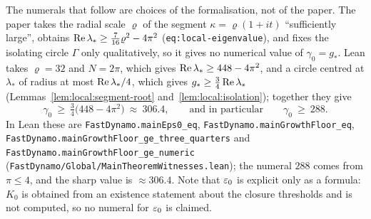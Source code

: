 The numerals that follow are choices of the formalisation, not of the paper.  The paper
takes the radial scale $\varrho$ of the segment $\kappa=\varrho(1+it)$ ``sufficiently
large'', obtains $\operatorname{Re}\lambda_*\geq\tfrac7{16}\varrho^2-4\pi^2$
(\texttt{eq:local-eigenvalue}), and fixes the isolating circle $\Gamma$ only qualitatively,
so it gives no numerical value of $\gamma_0=g_*$.  Lean takes $\varrho=32$ and $N=2\pi$,
which gives $\operatorname{Re}\lambda_*\geq448-4\pi^2$, and a circle centred at $\lambda_*$ of radius at
most $\operatorname{Re}\lambda_*/4$, which gives $g_*\geq\tfrac34\operatorname{Re}\lambda_*$
(Lemmas~\ref{lem:local:segment-root} and~\ref{lem:local:isolation}); together they give
\[
  \gamma_0\ \geq\ \tfrac34\bigl(448-4\pi^2\bigr)\ \approx\ 306.4,
  \qquad\text{and in particular}\qquad
  \gamma_0\ \geq\ 288 .
\]
In Lean these are \texttt{FastDynamo.mainEps0\_eq},
\texttt{FastDynamo.mainGrowthFloor\_eq},
\texttt{FastDynamo.mainGrowthFloor\_ge\_three\_quarters} and
\texttt{FastDynamo.mainGrowthFloor\_ge\_numeric}
(\texttt{FastDynamo/Global/MainTheoremWitnesses.lean}); the numeral $288$ comes from
$\pi\leq4$, and the sharp value is $\approx306.4$.  Note that $\varepsilon_0$ is explicit only as a
formula: $K_0$ is obtained from an existence statement about the closure thresholds and is
not computed, so no numeral for $\varepsilon_0$ is claimed.

